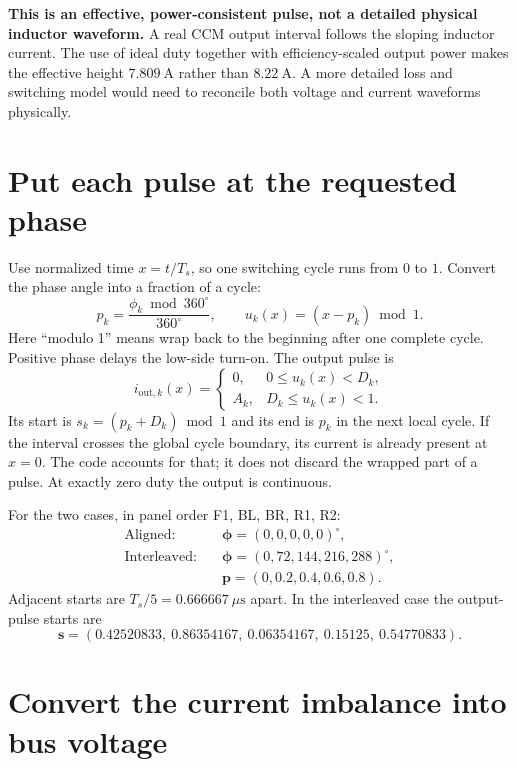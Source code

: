 \documentclass[11pt,a4paper]{article}
\begin{document}
\textbf{This is an effective, power-consistent pulse, not a detailed physical
inductor waveform.} A real CCM output interval follows the sloping inductor
current. The use of ideal duty together with efficiency-scaled output power
makes the effective height $7.809\ \mathrm{A}$ rather than $8.22\ \mathrm{A}$.
A more detailed loss and switching model would need to reconcile both voltage
and current waveforms physically.

\section{Put each pulse at the requested phase}

Use normalized time $x=t/T_s$, so one switching cycle runs from $0$ to $1$.
Convert the phase angle into a fraction of a cycle:
\[
 p_k=\frac{\phi_k\bmod360^\circ}{360^\circ},\qquad
 u_k(x)=(x-p_k)\bmod1.
\]
Here ``modulo 1'' means wrap back to the beginning after one complete cycle.
Positive phase delays the low-side turn-on. The output pulse is
\[
 i_{\mathrm{out},k}(x)=
 \begin{cases}
  0, & 0\leq u_k(x)<D_k,\\
  A_k, & D_k\leq u_k(x)<1.
 \end{cases}
\]
Its start is $s_k=(p_k+D_k)\bmod1$ and its end is $p_k$ in the next local cycle.
If the interval crosses the global cycle boundary, its current is already
present at $x=0$. The code accounts for that; it does not discard the wrapped
part of a pulse. At exactly zero duty the output is continuous.

For the two cases, in panel order F1, BL, BR, R1, R2:
\begin{align*}
 \text{Aligned:}\quad &\boldsymbol\phi=(0,0,0,0,0)^\circ,\\
 \text{Interleaved:}\quad &\boldsymbol\phi=(0,72,144,216,288)^\circ,\\
 &\boldsymbol p=(0,0.2,0.4,0.6,0.8).
\end{align*}
Adjacent starts are $T_s/5=0.666667\ \mu\mathrm{s}$ apart.
In the interleaved case the output-pulse starts are
\[
 \boldsymbol s=(0.42520833,\ 0.86354167,\ 0.06354167,\ 0.15125,\ 0.54770833).
\]

\section{Convert the current imbalance into bus voltage}
\end{document}

